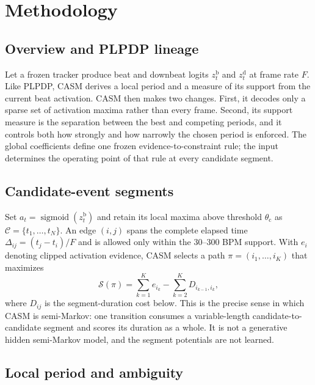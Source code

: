 \documentclass{article}
\begin{document}
\section{Methodology}
\label{sec:method}

\subsection{Overview and PLPDP lineage}
\label{sec:casm}
Let a frozen tracker produce beat and downbeat logits $z_t^{\mathrm b}$ and
$z_t^{\mathrm d}$ at frame rate $F$. Like PLPDP, CASM derives a local period
and a measure of its support from the current beat activation. CASM then makes
two changes. First, it decodes only a sparse set of activation maxima rather
than every frame. Second, its support measure is the separation between the
best and competing periods, and it controls both how strongly and how narrowly
the chosen period is enforced. The global coefficients define one frozen
evidence-to-constraint rule; the input determines the operating point of that
rule at every candidate segment.

\subsection{Candidate-event segments}
Set $a_t=\operatorname{sigmoid}(z_t^{\mathrm b})$ and retain its local maxima
above threshold $\theta_{\mathrm c}$ as
$\mathcal C=\{t_1,\ldots,t_N\}$. An edge $(i,j)$ spans the complete elapsed
time $\Delta_{ij}=(t_j-t_i)/F$ and is allowed only within the 30--300 BPM
support. With $e_i$ denoting clipped activation evidence, CASM selects a path
$\pi=(i_1,\ldots,i_K)$ that maximizes
\begin{equation}
\mathcal S(\pi)=\sum_{k=1}^{K}e_{i_k}
-\sum_{k=2}^{K}D_{i_{k-1},i_k},
\label{eq:casm-objective}
\end{equation}
where $D_{ij}$ is the segment-duration cost below. This is the precise sense in
which CASM is semi-Markov: one transition consumes a variable-length
candidate-to-candidate segment and scores its duration as a whole. It is not a
generative hidden semi-Markov model, and the segment potentials are not learned.

\subsection{Local period and ambiguity}
\end{document}
